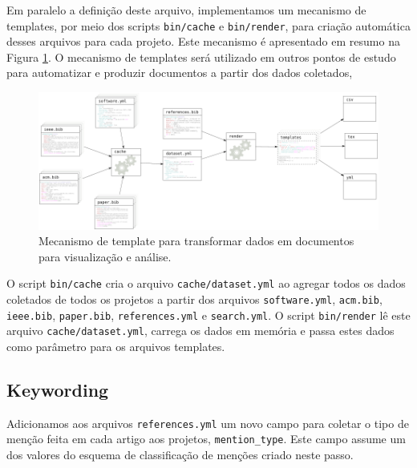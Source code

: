 Em paralelo a definição deste arquivo, implementamos um mecanismo de templates,
por meio dos scripts \texttt{bin/cache} e \texttt{bin/render}, para criação
automática desses arquivos para cada projeto. 
Este mecanismo é apresentado em resumo na Figura
\ref{template-fluxograma}.
O mecanismo de templates será
utilizado em outros pontos de estudo para automatizar e produzir documentos a
partir dos dados coletados, 

\begin{figure}[h]
  \center
  \includegraphics[scale=0.3]{imagens/template-fluxograma.png}
  \caption{Mecanismo de template para transformar dados em documentos para visualização e análise.}
  \label{template-fluxograma}
\end{figure}


O script \texttt{bin/cache} cria o arquivo \texttt{cache/dataset.yml} ao
agregar todos os dados coletados de todos os projetos a partir dos arquivos
\texttt{software.yml}, \texttt{acm.bib}, \texttt{ieee.bib}, \texttt{paper.bib},
\texttt{references.yml} e \texttt{search.yml}.
O script \texttt{bin/render} lê este arquivo \texttt{cache/dataset.yml},
carrega os dados em memória e passa estes dados como parâmetro para os arquivos
templates.

\subsection{Keywording}

Adicionamos aos arquivos \texttt{references.yml} um novo campo para coletar o
tipo de menção feita em cada artigo aos projetos, \texttt{mention\_type}. Este
campo assume um dos valores do esquema de classificação de menções criado neste passo.


